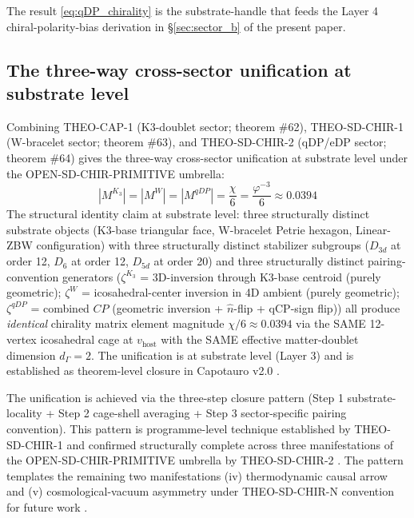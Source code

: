 \documentclass[11pt,letterpaper]{article}
\newcommand{\dGamma}{d_\Gamma}
\begin{document}
The result \eqref{eq:qDP_chirality} is the substrate-handle that feeds the Layer 4 chiral-polarity-bias derivation in §\ref{sec:sector_b} of the present paper.

\subsection{The three-way cross-sector unification at substrate level}
\label{sec:three_way_unification}

Combining THEO-CAP-1 \cite{ResearchFrontier, Capotauro} (K3-doublet sector; theorem \#62), THEO-SD-CHIR-1 (W-bracelet sector; theorem \#63), and THEO-SD-CHIR-2 (qDP/eDP sector; theorem \#64) gives the three-way cross-sector unification at substrate level under the OPEN-SD-CHIR-PRIMITIVE umbrella:
\begin{equation}
\boxed{\left| M^{K_3} \right| = \left| M^W \right| = \left| M^{qDP} \right| = \frac{\chi}{6} = \frac{\varphi^{-3}}{6} \approx 0.0394}
\label{eq:umbrella_three_way}
\end{equation}
The structural identity claim at substrate level: three structurally distinct substrate objects (K3-base triangular face, W-bracelet Petrie hexagon, Linear-ZBW configuration) with three structurally distinct stabilizer subgroups ($D_{3d}$ at order 12, $D_6$ at order 12, $D_{5d}$ at order 20) and three structurally distinct pairing-convention generators ($\zeta^{K_3}$ = 3D-inversion through K3-base centroid (purely geometric); $\zeta^W$ = icosahedral-center inversion in 4D ambient (purely geometric); $\zeta^{qDP}$ = combined $CP$ (geometric inversion + $\hat{n}$-flip + qCP-sign flip)) all produce \emph{identical} chirality matrix element magnitude $\chi/6 \approx 0.0394$ via the SAME 12-vertex icosahedral cage at $v_{\text{host}}$ with the SAME effective matter-doublet dimension $\dGamma = 2$. The unification is at substrate level (Layer 3) and is established as theorem-level closure in Capotauro v2.0 \cite{Capotauro}.

The unification is achieved via the three-step closure pattern (Step 1 substrate-locality + Step 2 cage-shell averaging + Step 3 sector-specific pairing convention). This pattern is programme-level technique established by THEO-SD-CHIR-1 and confirmed structurally complete across three manifestations of the OPEN-SD-CHIR-PRIMITIVE umbrella by THEO-SD-CHIR-2 \cite{Capotauro}. The pattern templates the remaining two manifestations (iv) thermodynamic causal arrow and (v) cosmological-vacuum asymmetry under THEO-SD-CHIR-N convention for future work \cite{ResearchFrontier}.
\end{document}
